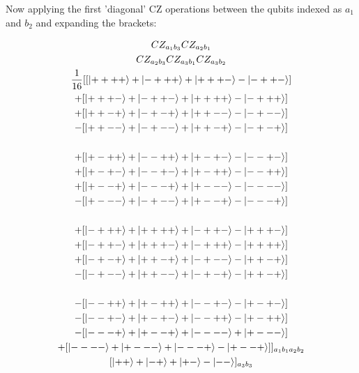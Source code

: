 Now applying the first 'diagonal' CZ operations between the qubits indexed as $a_{1}$ and $b_{2}$ and expanding the brackets:

\begin{multline*}
CZ _{a_{1} b_{3}} CZ _{a_{2} b_{1}} \\
CZ _{a_{2} b_{3}} CZ _{a_{3} b_{1}} CZ _{a_{3} b_{2}} \\
\frac{1}{16} 
[[\ket{+ + + +} + \ket{- + + +} + \ket{+ + + -} - \ket{- + + -}] \\
+ [\ket{+ + + -} + \ket{- + + -} + \ket{+ + + +} - \ket{- + + +}] \\
+ [\ket{+ + - +} + \ket{- + - +} + \ket{+ + - -} - \ket{- + - -}] \\
- [\ket{+ + - -} + \ket{- + - -} + \ket{+ + - +} - \ket{- + - +}] \\
\\
+ [\ket{+ - + +} + \ket{- - + +} + \ket{+ - + -} - \ket{- - + -}] \\
+ [\ket{+ - + -} + \ket{- - + -} + \ket{+ - + +} - \ket{- - + +}]  \\
+ [\ket{+ - - +} + \ket{- - - +} + \ket{+ - - -} - \ket{- - - -}] \\
- [\ket{+ - - -} + \ket{- + - -} + \ket{+ - - +} - \ket{- - - +}] \\
\\
+ [\ket{- + + +} + \ket{+ + + +} + \ket{- + + -} - \ket{+ + + -}] \\
+ [\ket{- + + -} + \ket{+ + + -} + \ket{- + + +} - \ket{+ + + +}] \\
+ [\ket{- + - +} + \ket{+ + - +} + \ket{- + - -} - \ket{+ + - +}] \\
- [\ket{- + - -} + \ket{+ + - -} + \ket{- + - +} - \ket{+ + - +}] \\
\\
- [\ket{- - + +} + \ket{+ - + +} + \ket{- - + -} - \ket{+ - + -}] \\
- [\ket{- - + -} + \ket{+ - + -} + \ket{- - + +} - \ket{+ - + +}] \\
- [\ket{- - - +} + \ket{+ - - +} + \ket{- - - -} + \ket{+ - - -}] \\
+ [\ket{- - - -} + \ket{+ - - -} + \ket{- - - +} - \ket{+ - - +}]] _{a_{1} b_{1} a_{2} b_{2}} \\
[ \ket{+ +} + \ket{- +} + \ket{+ -} - \ket{- -} ] _{a_{3} b_{3}} \\
\end{multline*}



